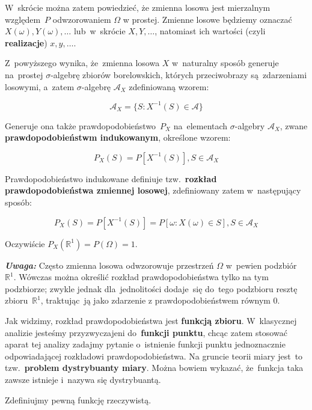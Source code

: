 \documentclass[10pt,a4paper]{article}
\newcommand{\Warning}{\marginpar{\dbend}\textbf{\textit{Uwaga: }}}
\numberwithin{equation}{subsection}
\begin{document}
W~skrócie można zatem powiedzieć, że zmienna losowa jest mierzalnym względem~$P$
odwzorowaniem $\Omega$ w prostej. Zmienne losowe będziemy oznaczać $X(\omega),
Y(\omega),\dotsc$ lub~w~skrócie $X, Y,\dotsc$, natomiast ich wartości (czyli
\textbf{realizacje}) $x, y,\dotsc$.

Z~powyższego wynika, że~zmienna losowa $X$ w~naturalny sposób generuje na~prostej
$\sigma$-algebrę zbiorów borelowskich, których przeciwobrazy są~zdarzeniami
losowymi, a~zatem $\sigma$-algebrę $\mathscr{A}_X$ zdefiniowaną wzorem:

\begin{equation}
  \mathscr{A}_X = \{S: X^{-1}(S)\in\mathscr{A}\}
\end{equation}

Generuje ona także prawdopodobieństwo~$P_X$ na~elementach $\sigma$-algebry
$\mathscr{A}_X$, zwane \textbf{prawdopodobieństwm indukowanym}, określone wzorem:

\begin{equation}
  P_X(S) = P[X^{-1}(S)], S\in\mathscr{A}_X
\end{equation}

Prawdopodobieństwo indukowane definiuje tzw.~\textbf{rozkład prawdopodobieństwa
  zmiennej losowej}, zdefiniowany zatem w~następujący sposób:

\begin{equation}
  P_X(S) = P[X^{-1}(S)] = P[\omega: X(\omega)\in S], S\in\mathscr{A}_X
\end{equation}

Oczywiście $P_X(\mathbb{R}^1) = P(\Omega) = 1$.

\Warning Często zmienna losowa odwzorowuje przestrzeń $\Omega$ w~pewien
podzbiór~$\mathbb{R}^1$. Wówczas można określić rozkład prawdopodobieństwa tylko na tym
podzbiorze; zwykle jednak dla~jednolitości dodaje~się do~tego podzbioru resztę
zbioru~$\mathbb{R}^1$, traktując~ją jako zdarzenie z prawdopodobieństwem równym $0$.

Jak widzimy, rozkład prawdopodobieństwa jest \textbf{funkcją zbioru}. W~klasycznej
analizie jesteśmy przyzwyczajeni do~\textbf{funkcji punktu}, chcąc zatem stosować
aparat tej analizy zadajmy pytanie o~istnienie funkcji punktu jednoznacznie
odpowiadającej rozkładowi prawdopodobieństwa. Na gruncie teorii miary jest~to
tzw.~\textbf{problem dystrybuanty miary}. Można bowiem wykazać, że~funkcja taka
zawsze istnieje i~nazywa się dystrybuantą.

Zdefiniujmy pewną funkcję rzeczywistą.
\end{document}
